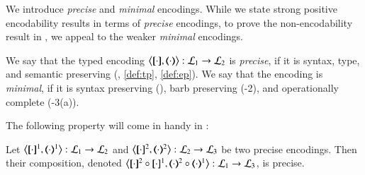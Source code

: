 \documentclass[runningheads]{llncs}
\begin{document}
{We introduce 
\emph{precise} and \emph{minimal}
 encodings.
While we state strong positive encodability results %
in terms of {\em precise} encodings,
to prove the non-encodability result in , 
we appeal to the weaker {\em minimal} encodings.  

\begin{definition}%
\label{def:goodenc}
We say that 
	the typed encoding 
	$\enco{\map{\cdot}, \mapt{\cdot} %
	}: \tyl{L}_1 \to \tyl{L}_2$ is 
	\emph{precise}, if it is syntax, type, and semantic preserving (, \ref{def:tp}, \ref{def:ep}).
	We say that the encoding is
	\emph{minimal}, if it is syntax preserving 
	(),
	barb preserving (-2), 
	and operationally complete (-3(a)).
\end{definition}




The following property will come in handy in :

\begin{proposition}%
	\label{pro:composition}
	Let %
	$\enco{\map{\cdot}^{1}, \mapt{\cdot}^{1}%
	}: \tyl{L}_1 \to \tyl{L}_2$
	and 
	$\enco{\map{\cdot}^{2}, \mapt{\cdot}^{2}%
	}: \tyl{L}_2 \to \tyl{L}_3$
	be two precise %
	encodings.
	Then their composition, denoted 
	$\enco{\map{\cdot}^{2} \circ \map{\cdot}^{1}, \mapt{\cdot}^{2} \circ \mapt{\cdot}^{1} %
	}: \tyl{L}_1 \to \tyl{L}_3$,
	is precise. 
\end{proposition}


}
\end{document}
